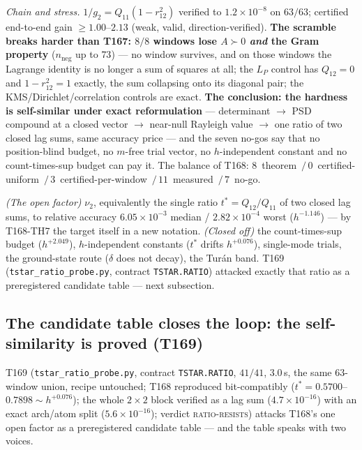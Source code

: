 \documentclass[11pt,a4paper]{article}
\begin{document}
\emph{Chain and stress.} $1/g_2=Q_{11}(1-r_{12}^2)$ verified to
$1.2\times10^{-8}$ on $63/63$; certified end-to-end gain $\ge1.00$--$2.13$
(weak, valid, direction-verified). \textbf{The scramble breaks harder than
T167: $8/8$ windows lose $A\succ0$ \emph{and} the Gram property}
($n_{\mathrm{neg}}$ up to $73$) --- no window survives, and on those windows
the Lagrange identity is no longer a sum of squares at all; the $L_P$
control has $Q_{12}=0$ and $1-r_{12}^2=1$ exactly, the sum collapsing onto
its diagonal pair; the KMS/Dirichlet/correlation controls are exact.
\textbf{The conclusion: the hardness is self-similar under exact
reformulation} --- determinant $\to$ PSD compound at a closed vector $\to$
near-null Rayleigh value $\to$ one ratio of two closed lag sums, same
accuracy price --- and the seven no-gos say that no position-blind budget,
no $m$-free trial vector, no $h$-independent constant and no count-times-sup
budget can pay it. The balance of T168:
$8$~theorem~$/\,0$~certified-uniform~$/\,3$~certified-per-window~$/\,
11$~measured~$/\,7$~no-go.

\begin{keybox}
\emph{(The open factor)} $\nu_2$, equivalently the single ratio
$t^*=Q_{12}/Q_{11}$ of two closed lag sums, to relative accuracy
$6.05\times10^{-3}$ median / $2.82\times10^{-4}$ worst ($h^{-1.146}$) ---
by T168-TH7 the target itself in a new notation. \emph{(Closed off)} the
count-times-sup budget ($h^{+2.049}$), $h$-independent constants ($t^*$
drifts $h^{+0.076}$), single-mode trials, the ground-state route ($\delta$
does not decay), the Tur\'an band. T169 (\texttt{tstar\_ratio\_probe.py},
contract \texttt{TSTAR.RATIO}) attacked exactly that ratio as a
preregistered candidate table --- next subsection.
\end{keybox}

\subsection{The candidate table closes the loop: the self-similarity is
proved (T169)}
T169 (\texttt{tstar\_ratio\_probe.py}, contract \texttt{TSTAR.RATIO},
$41/41$, $3.0$\,s, the same $63$-window union, recipe untouched; T168
reproduced bit-compatibly ($t^*=0.5700$--$0.7898\sim h^{+0.076}$); the whole
$2\times2$ block verified as a lag sum ($4.7\times10^{-16}$) with an exact
arch/atom split ($5.6\times10^{-16}$); verdict \textsc{ratio-resists})
attacks T168's one open factor as a preregistered candidate table --- and
the table speaks with two voices.
\end{document}
